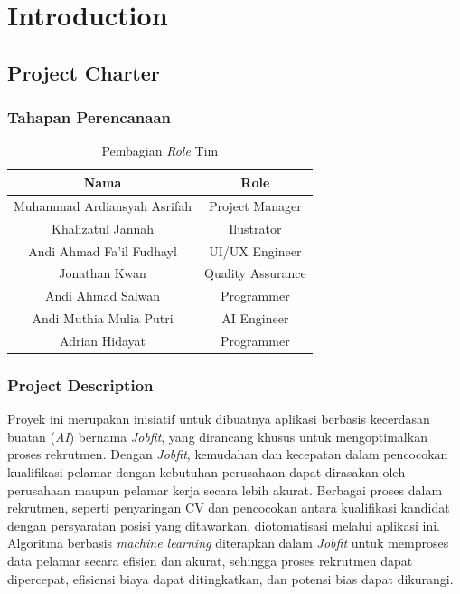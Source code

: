 \documentclass[journal,article,submit,pdftex,moreauthors]{Definitions/mdpi}
\begin{document}
\setcounter{section}{-1} %


\section{Introduction}

\subsection{Project Charter}

\subsubsection{Tahapan Perencanaan}

\begin{table}[ht]
\centering
\begin{tabular}{|c|c|}
\hline
\textbf{Nama} & \textbf{Role} \\
\hline
Muhammad Ardiansyah Asrifah & Project Manager \\
Khalizatul Jannah & Ilustrator \\
Andi Ahmad Fa'il Fudhayl & UI/UX Engineer \\
Jonathan Kwan & Quality Assurance \\
Andi Ahmad Salwan & Programmer \\
Andi Muthia Mulia Putri & AI Engineer \\
Adrian Hidayat & Programmer \\
\hline
\end{tabular}
\captionsetup{justification=centering}
\caption{Pembagian \textit{Role} Tim}
\end{table}

\subsubsection{Project Description}
Proyek ini merupakan inisiatif untuk dibuatnya aplikasi berbasis kecerdasan buatan (\textit{AI}) bernama \textit{Jobfit}, yang dirancang khusus untuk mengoptimalkan proses rekrutmen. Dengan \textit{Jobfit}, kemudahan dan kecepatan dalam pencocokan kualifikasi pelamar dengan kebutuhan perusahaan dapat dirasakan oleh perusahaan maupun pelamar kerja secara lebih akurat. Berbagai proses dalam rekrutmen, seperti penyaringan CV dan pencocokan antara kualifikasi kandidat dengan persyaratan posisi yang ditawarkan, diotomatisasi melalui aplikasi ini. Algoritma berbasis \textit{machine learning} diterapkan dalam \textit{Jobfit} untuk memproses data pelamar secara efisien dan akurat, sehingga proses rekrutmen dapat dipercepat, efisiensi biaya dapat ditingkatkan, dan potensi bias dapat dikurangi.
\end{document}

